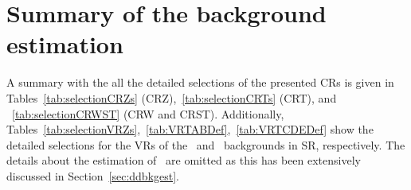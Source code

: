 \chapter{Summary of the background estimation}
\label{app:sumbkgest}
	
	A summary with the all the detailed selections of the presented \acp{CR} is given in Tables~\ref{tab:selectionCRZs} (CRZ),~\ref{tab:selectionCRTs} (CRT), and ~\ref{tab:selectionCRWST} (CRW and CRST). Additionally, Tables~\ref{tab:selectionVRZs},~\ref{tab:VRTABDef},~\ref{tab:VRTCDEDef} show the detailed selections for the \acp{VR} of the \Zjets\ and \ttbar\ backgrounds in \ac{SR}, respectively. The details about the estimation of \ttZ\ are omitted as this has been extensively discussed in Section~\ref{sec:ddbkgest}. 

